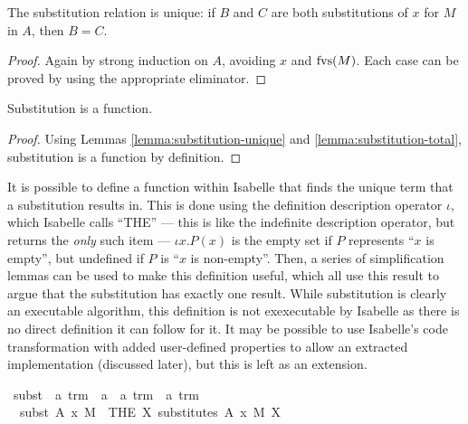 \begin{lemma}
\label{lemma:substitution-unique}
The substitution relation is unique: if \(B\) and \(C\) are both substitutions of \(x\) for \(M\) in \(A\), then \(B = C\).
\end{lemma}
\begin{proof}
Again by strong induction on \(A\), avoiding \(x\) and \(\mathrm{fvs}(M)\).
Each case can be proved by using the appropriate eliminator.
\end{proof}

\begin{lemma}
Substitution is a function.
\end{lemma}
\begin{proof}
Using Lemmas \ref{lemma:substitution-unique} and \ref{lemma:substitution-total}, substitution is a function by definition.
\end{proof}

It is possible to define a function within Isabelle that finds the unique term that a substitution results in.
This is done using the definition description operator \(\iota\), which Isabelle calls ``THE'' --- this is like the indefinite description operator, but returns the \emph{only} such item --- \(\iota x. P(x)\) is the empty set if \(P\) represents ``\(x\) is empty'', but undefined if \(P\) is ``\(x\) is non-empty''.
Then, a series of simplification lemmas can be used to make this definition useful, which all use this result to argue that the substitution has exactly one result.
While substitution is clearly an executable algorithm, this definition is not exexecutable by Isabelle as there is no direct definition it can follow for it.
It may be possible to use Isabelle's code transformation with added user-defined properties to allow an extracted implementation (discussed later), but this is left as an extension.

\begin{implementation}
\isamarkupfalse%
\ subst\ {\isacharcolon}{\isacharcolon}\ {\isachardoublequoteopen}{\isacharprime}a\ trm\ {\isasymRightarrow}\ {\isacharprime}a\ {\isasymRightarrow}\ {\isacharprime}a\ trm\ {\isasymRightarrow}\ {\isacharprime}a\ trm{\isachardoublequoteclose}\ {\isacharparenleft}{\isachardoublequoteopen}{\isacharunderscore}{\isacharbrackleft}{\isacharunderscore}\ {\isacharcolon}{\isacharcolon}{\isacharequal}\ {\isacharunderscore}{\isacharbrackright}{\isachardoublequoteclose}{\isacharparenright}\ \isanewline
\ \ {\isachardoublequoteopen}subst\ A\ x\ M\ {\isasymequiv}\ {\isacharparenleft}THE\ X{\isachardot}\ substitutes\ A\ x\ M\ X{\isacharparenright}{\isachardoublequoteclose}\isanewline
\end{implementation}

